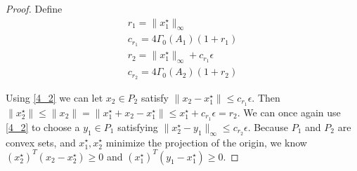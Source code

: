 \documentclass{article}
\theoremstyle{case}
\begin{document}
\begin{proof}
Define
\begin{align*}
r_1 = \|x_1^{\star}\|_{\infty} \\
c_{r_1} = 4\Gamma_0(A_1)\left(1 + r_1\right) \\
r_2 =  \|x_1^{\star}\|_{\infty} + c_{r_1}\epsilon \\
c_{r_2}=  4\Gamma_0(A_2)\left(1 + r_2\right)
\end{align*}

Using \cref{4_2} we can let $x_2 \in P_2$ satisfy $\|x_2 - x_1^{\star}\| \le c_{r_1}\epsilon$.
Then
$\|x_2^{\star}\| \le \|x_2\| = \|x_1^{\star} + x_2 - x_1^{\star}\| \le x_1^{\star} + c_{r_1}\epsilon = r_2$.
We can once again use \cref{4_2} to choose a $y_1 \in P_1$ satisfying $\|x_2^{\star} - y_1\|_{\infty} \le c_{r_2}\epsilon$.
Because $P_1$ and $P_2$ are convex sets, and $x_1^{\star}, x_2^{\star}$ minimize the projection of the origin, we know
$\left(x_2^{\star}\right)^T \left(x_2 - x_2^{\star}\right)\ge 0$ and
$\left(x_1^{\star}\right)^T \left(y_1 - x_1^{\star}\right)\ge 0$.


\end{proof}
\end{document}
